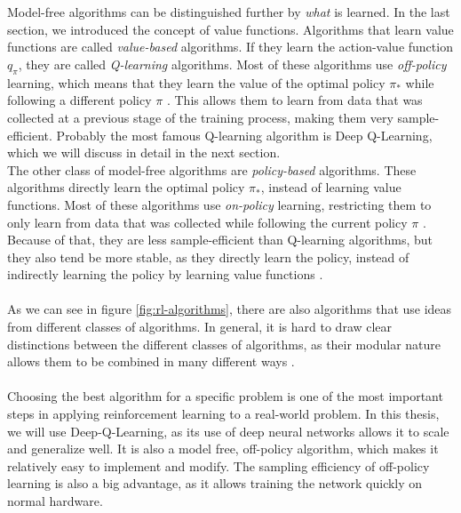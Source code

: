 \\
\\
Model-free algorithms can be distinguished further by \textit{what} is learned. In the last section, we introduced the concept of value functions. Algorithms that learn value functions are called \textit{value-based} algorithms. If they learn the action-value function $q_\pi$, they are called \textit{Q-learning} algorithms. Most of these algorithms use \textit{off-policy} learning, which means that they learn the value of the optimal policy $\pi_*$ while following a different policy $\pi$ \cite{openai_spinning_up_rl_part2}. This allows them to learn from data that was collected at a previous stage of the training process, making them very sample-efficient. Probably the most famous Q-learning algorithm is Deep Q-Learning, which we will discuss in detail in the next section.
\\
The other class of model-free algorithms are \textit{policy-based} algorithms. These algorithms directly learn the optimal policy $\pi_*$, instead of learning value functions. Most of these algorithms use \textit{on-policy} learning, restricting them to only learn from data that was collected while following the current policy $\pi$ \cite{openai_spinning_up_rl_part2}. Because of that, they are less sample-efficient than Q-learning algorithms, but they also tend be more stable, as they directly learn the policy, instead of indirectly learning the policy by learning value functions \cite{openai_spinning_up_rl_part2}. 
\\
\\
As we can see in figure \ref{fig:rl-algorithms}, there are also algorithms that use ideas from different classes of algorithms. In general, it is hard to draw clear distinctions between the different classes of algorithms, as their modular nature allows them to be combined in many different ways \cite{openai_spinning_up_rl_part2}.
\\
\\
Choosing the best algorithm for a specific problem is one of the most important steps in applying reinforcement learning to a real-world problem. In this thesis, we will use Deep-Q-Learning, as its use of deep neural networks allows it to scale and generalize well. It is also a model free, off-policy algorithm, which makes it relatively easy to implement and modify. The sampling efficiency of off-policy learning is also a big advantage, as it allows training the network quickly on normal hardware. 



